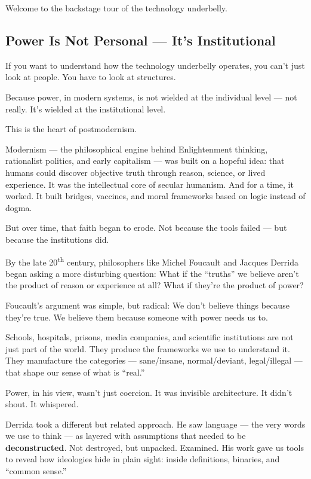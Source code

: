 Welcome to the backstage tour of the technology underbelly.


\subsection{Power Is Not Personal — It’s Institutional}

If you want to understand how the technology underbelly operates, you can’t just look at people.  
You have to look at structures.

Because power, in modern systems, is not wielded at the individual level — not really.  
It’s wielded at the institutional level.

This is the heart of postmodernism.

Modernism — the philosophical engine behind Enlightenment thinking, rationalist politics, and early capitalism — was built on a hopeful idea:  
that humans could discover objective truth through reason, science, or lived experience.  
It was the intellectual core of secular humanism.  
And for a time, it worked. It built bridges, vaccines, and moral frameworks based on logic instead of dogma.

But over time, that faith began to erode. Not because the tools failed — but because the institutions did.

By the late 20\textsuperscript{th} century, philosophers like Michel Foucault and Jacques Derrida began asking a more disturbing question:  
What if the “truths” we believe aren’t the product of reason or experience at all?  
What if they’re the product of power?

Foucault’s argument was simple, but radical:  
We don’t believe things because they’re true.  
We believe them because someone with power needs us to.

Schools, hospitals, prisons, media companies, and scientific institutions are not just part of the world.  
They produce the frameworks we use to understand it. They manufacture the categories --- sane/insane, normal/deviant, legal/illegal --- that shape our sense of what is “real.”

Power, in his view, wasn’t just coercion. It was invisible architecture.  
It didn’t shout. It whispered.

Derrida took a different but related approach.  
He saw language --- the very words we use to think --- as layered with assumptions that needed to be \textbf{deconstructed}.  
Not destroyed, but unpacked. Examined.  
His work gave us tools to reveal how ideologies hide in plain sight: inside definitions, binaries, and ``common sense.''

